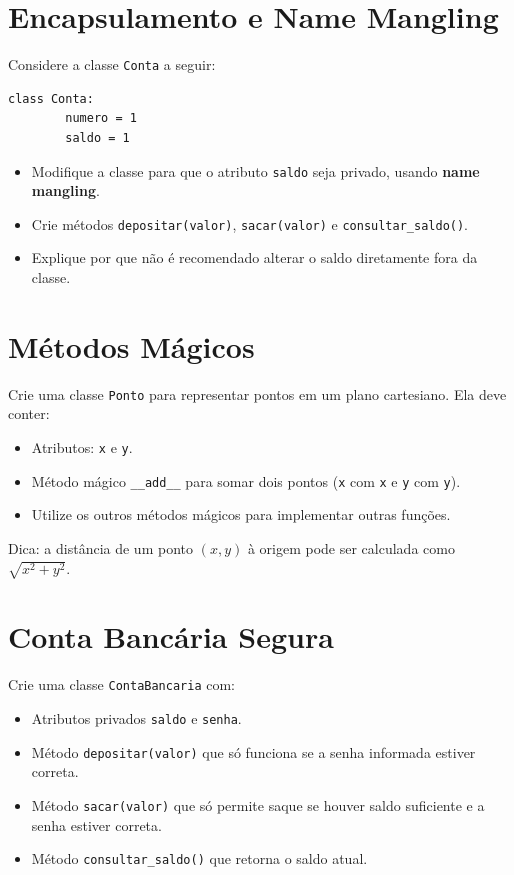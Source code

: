 \section{Encapsulamento e Name Mangling}
Considere a classe \texttt{Conta} a seguir:

\begin{verbatim}
class Conta:
        numero = 1
        saldo = 1
\end{verbatim}

\begin{itemize}
    \item[(a)] Modifique a classe para que o atributo \texttt{saldo} seja privado, usando \textbf{name mangling}.
    \item[(b)] Crie métodos \texttt{depositar(valor)}, \texttt{sacar(valor)} e \texttt{consultar\_saldo()}.
    \item[(c)] Explique por que não é recomendado alterar o saldo diretamente fora da classe.
\end{itemize}

\section{Métodos Mágicos}
Crie uma classe \texttt{Ponto} para representar pontos em um plano cartesiano.
Ela deve conter:
\begin{itemize}
    \item Atributos: \texttt{x} e \texttt{y}.
    \item Método mágico \texttt{\_\_add\_\_} para somar dois pontos (\texttt{x} com \texttt{x} e \texttt{y} com \texttt{y}).
    \item Utilize os outros métodos mágicos para implementar outras funções.

\end{itemize}

Dica: a distância de um ponto $(x, y)$ à origem pode ser calculada como $\sqrt{x^2 + y^2}$.




\section{Conta Bancária Segura}
Crie uma classe \texttt{ContaBancaria} com:
\begin{itemize}
    \item Atributos privados \texttt{saldo} e \texttt{senha}.
    \item Método \texttt{depositar(valor)} que só funciona se a senha informada estiver correta.
    \item Método \texttt{sacar(valor)} que só permite saque se houver saldo suficiente e a senha estiver correta.
    \item Método \texttt{consultar\_saldo()} que retorna o saldo atual.
\end{itemize}

